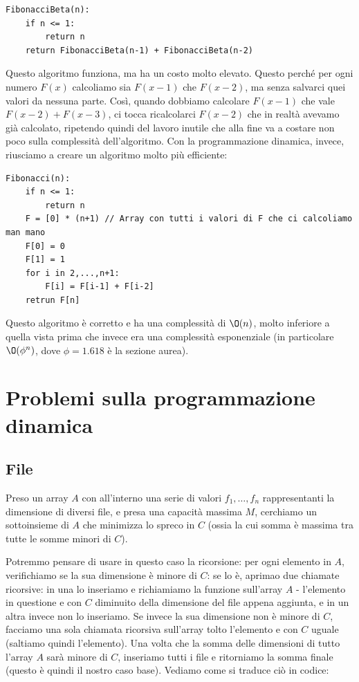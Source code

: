 \documentclass[11pt, a4paper, titlepage, oneside]{scrbook}
\begin{document}
\begin{lstlisting}
FibonacciBeta(n):
    if n <= 1:
        return n
    return FibonacciBeta(n-1) + FibonacciBeta(n-2)
\end{lstlisting}

Questo algoritmo funziona, ma ha un costo molto elevato. Questo perché per ogni numero $F(x)$ calcoliamo sia $F(x-1)$ che $F(x-2)$, ma senza salvarci quei valori da nessuna parte. Così, quando dobbiamo calcolare $F(x-1)$ che vale $F(x-2) + F(x-3)$, ci tocca ricalcolarci $F(x-2)$ che in realtà avevamo già calcolato, ripetendo quindi del lavoro inutile che alla fine va a costare non poco sulla complessità dell'algoritmo. Con la programmazione dinamica, invece, riusciamo a creare un algoritmo molto più efficiente:

\begin{lstlisting}
Fibonacci(n):
    if n <= 1:
        return n
    F = [0] * (n+1) // Array con tutti i valori di F che ci calcoliamo man mano
    F[0] = 0
    F[1] = 1
    for i in 2,...,n+1:
        F[i] = F[i-1] + F[i-2]
    retrun F[n]
\end{lstlisting}

Questo algoritmo è corretto e ha una complessità di $\O(n)$, molto inferiore a quella vista prima che invece era una complessità esponenziale (in particolare $\O(\phi^n)$, dove $\phi = 1.618$ è la sezione aurea).

\section{Problemi sulla programmazione dinamica}

\subsection{File}

Preso un array $A$ con all'interno una serie di valori $f_1, \ldots, f_n$ rappresentanti la dimensione di diversi file, e presa una capacità massima $M$, cerchiamo un sottoinsieme di $A$ che minimizza lo spreco in $C$ (ossia la cui somma è massima tra tutte le somme minori di $C$).

Potremmo pensare di usare in questo caso la ricorsione: per ogni elemento in $A$, verifichiamo se la sua dimensione è minore di $C$: se lo è, aprimao due chiamate ricorsive: in una lo inseriamo e richiamiamo la funzione sull'array $A$ - l'elemento in questione e con $C$ diminuito della dimensione del file appena aggiunta, e in un altra invece non lo inseriamo. Se invece la sua dimensione non è minore di $C$, facciamo una sola chiamata ricorsiva sull'array tolto l'elemento e con $C$ uguale (saltiamo quindi l'elemento). Una volta che la somma delle dimensioni di tutto l'array $A$ sarà minore di $C$, inseriamo tutti i file e ritorniamo la somma finale (questo è quindi il nostro caso base). Vediamo come si traduce ciò in codice:
\end{document}
